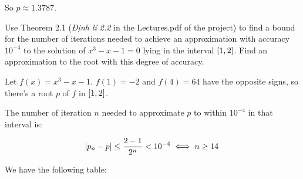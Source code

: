 \documentclass[../../Assignments.tex]{subfiles}
\begin{document}
\begin{solution}
    So \(p \approx \num{1.3787}\).
\end{solution}

\begin{exercise}
    Use Theorem 2.1 (\emph{Định lí 2.2} in the Lectures.pdf of the project) to
    find a bound for the number of iterations needed to achieve an approximation
    with accuracy \(10^{-4}\) to the solution of \(x^3 - x − 1 = 0\) lying in
    the interval \(\interval{1}{2}\). Find an approximation to the root with
    this degree of accuracy.
\end{exercise}

\begin{solution}
    Let \(f(x) = x^3 - x − 1\). \(f(1) = -2\) and \(f(4) = 64\) have the
    opposite signs, so there's a root \(p\) of \(f\) in \(\interval{1}{2}\).

    The number of iteration \(n\) needed to approximate \(p\) to within
    \(10^{-4}\) in that interval is:

    \[\abs{p_n - p} \leq \frac{2 - 1}{2^n} < 10^{-4} \iff n \geq 14\]

    We have the following table:


\end{solution}
\end{document}
